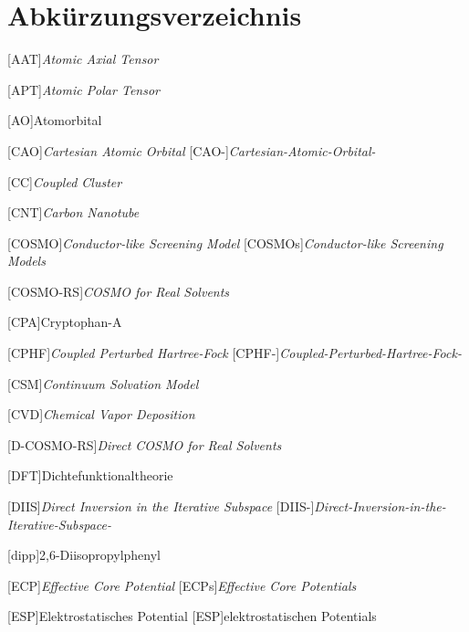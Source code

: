 \renewcommand\refname{Abkürzungsverzeichnis} \chapter{Abkürzungsverzeichnis}
\begin{acronym}[D-COSMO-RS] %
    \setlength{\itemsep}{0.2cm} %
    
    [AAT]{\textit{Atomic Axial Tensor}}
    
    [APT]{\textit{Atomic Polar Tensor}}
    
    [AO]{Atomorbital}
	
	[CAO]{\textit{Cartesian Atomic Orbital}}
	[CAO-]{\textit{Cartesian-Atomic-Orbital-}}
		
    [CC]{\textit{Coupled Cluster}}	
    
    [CNT]{\textit{Carbon Nanotube}}	
		
 	[COSMO]{\textit{Conductor-like Screening Model}}
 		[COSMOs]{\textit{Conductor-like Screening Models}}
 	
 	[COSMO-RS]{\textit{COSMO for Real Solvents}}

    [CPA]{Cryptophan-A} 	
 	
	[CPHF]{\textit{Coupled Perturbed Hartree-Fock}}
	[CPHF-]{\textit{Coupled-Perturbed-Hartree-Fock-}}
	
	[CSM]{\textit{Continuum Solvation Model}}
	
	[CVD]{\textit{Chemical Vapor Deposition}}
	
	[D-COSMO-RS]{\textit{Direct COSMO for Real Solvents}}
 	
    [DFT]{Dichtefunktionaltheorie}
    
    [DIIS]{\textit{Direct Inversion in the Iterative Subspace}}
    [DIIS-]{\textit{Direct-Inversion-in-the-Iterative-Subspace-}}
    
    [dipp]{2,6-Diisopropylphenyl}
    
    [ECP]{\textit{Effective Core Potential}}
        [ECPs]{\textit{Effective Core Potentials}}
    
    [ESP]{Elektrostatisches Potential}
	    [ESP]{elektrostatischen Potentials}


\end{acronym}
